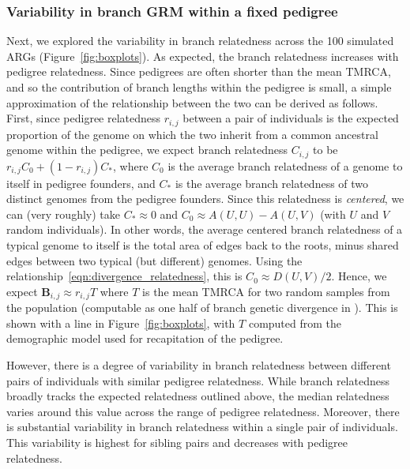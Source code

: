 \subsubsection{Variability in branch GRM within a fixed pedigree}

Next, we explored the variability in branch relatedness across the 100 simulated ARGs
(Figure~\ref{fig:boxplots}).
%
As expected, the branch relatedness increases with pedigree relatedness.
%
Since pedigrees are often shorter than the mean TMRCA,
and so the contribution of branch lengths within the pedigree is small,
a simple approximation of the relationship between the two
can be derived as follows.
%
First, since pedigree relatedness $r_{i,j}$ between a pair of individuals
is the expected proportion of the genome on which the two inherit from
a common ancestral genome within the pedigree,
we expect branch relatedness $C_{i,j}$ to be $r_{i,j} C_0 + (1 - r_{i,j}) C_*$,
where $C_0$ is the average branch relatedness of a genome to itself in pedigree founders,
and $C_*$ is the average branch relatedness of two distinct genomes from the pedigree founders.
%
Since this relatedness is \emph{centered}, we can (very roughly) take
$C_* \approx 0$ and $C_0 \approx A(U,U) - A(U,V)$ (with $U$ and $V$ random individuals).
%
In other words, the average centered branch relatedness
of a typical genome to itself is the total area of edges back to the roots,
minus shared edges between two typical (but different) genomes.
%
Using the relationship~\eqref{eqn:divergence_relatedness},
this is $C_0 \approx D(U,V)/2$.
%
Hence, we expect $\mathbf{B}_{i,j} \approx r_{i,j} T$
where $T$ is the mean TMRCA for two random samples from the population
(computable as one half of branch genetic divergence in \tskit{}).
%
This is shown with a line in Figure~\ref{fig:boxplots},
with $T$ computed from the demographic model used for recapitation of the pedigree.

However, there is a degree of variability in branch relatedness
between different pairs of individuals with similar pedigree relatedness.
%
While branch relatedness broadly tracks the expected relatedness outlined above,
the median relatedness varies around this value across the range of pedigree relatedness.
%
Moreover, there is substantial variability in branch relatedness within a single pair of individuals.
%
This variability is highest for sibling pairs and decreases with pedigree relatedness.

